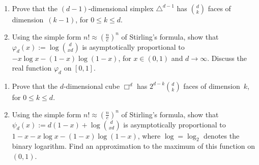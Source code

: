 \documentclass[12pt]{amsart}
\begin{document}
\begin{enumerate}[({1}a)]
\renewcommand{\itemsep}{5ex}

\item Prove that the $(d-1)$-dimensional simplex $\triangle^{d-1}$ has
  $\binom{d}{k}$ faces of dimension~$(k-1)$, for $0\le k\le d$.

\item Using the simple form $n!\approx(\frac{n}{e})^n$ of Stirling's
  formula, show that $\varphi_d(x):=\log\binom{d}{xd}$ is
  asymptotically proportional to $-x\log x - (1-x)\log(1-x)$, for
  $x\in(0,1)$ and $d\to\infty$. Discuss the real function $\varphi_d$
  on $[0,1]$.
\end{enumerate}

\bigskip\bigskip
\begin{enumerate}[({2}a)]
\renewcommand{\itemsep}{5ex}

\item Prove that the $d$-dimensional cube $\Box^d$ has
  $2^{d-k}\binom{d}{k}$ faces of dimension~$k$, for $0\le k\le d$.

\item Using the simple form $n!\approx(\frac{n}{e})^n$ of Stirling's
  formula, show that $\psi_d(x):=d(1-x) + \log\binom{d}{xd}$ is
  asymptotically proportional to $1-x-x\log x-(1-x)\log(1-x)$, where
  $\log=\log_2$ denotes the binary logarithm. Find an approximation to
  the maximum of this function on $(0,1)$.

\end{enumerate}
\end{document}
